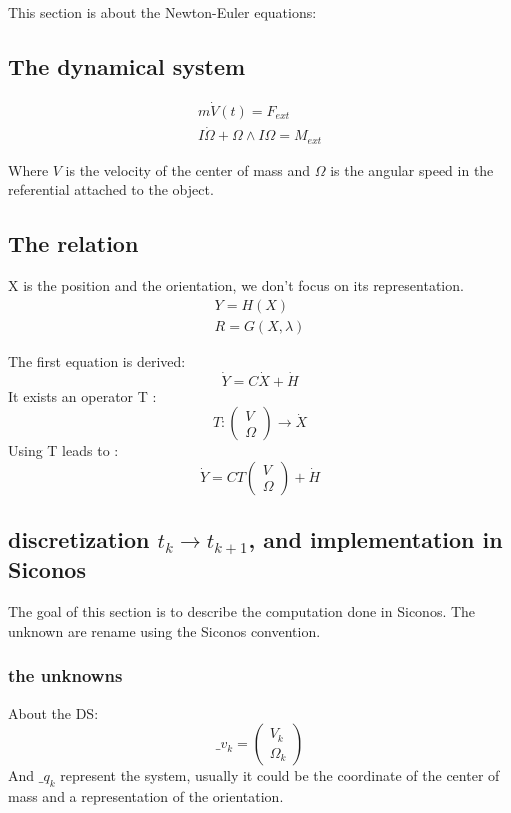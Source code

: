 This section is about the Newton-Euler equations:

\subsection{The dynamical system}

\begin{equation}
\label{NE_Dyn1}
\begin{array}{l}
m \dot{V}(t) = F_{ext}  \\
I \dot \Omega +\Omega \wedge I\Omega = M_{ext}
\end{array}
\end{equation}

Where $V$ is the velocity of the center of mass and $\Omega$ is the angular speed in the
referential attached to the object.

\subsection{The relation}
X is the position and the orientation, we don't focus on its representation.
\begin{equation}
\label{Relation}
\begin{array}{l}
Y=H(X)  \\
R=G(X,\lambda)
\end{array}
\end{equation}


The first equation is derived:
\[\dot Y = C \dot X + \dot H\]
It exists an operator T :
\[T:  \left(\begin{array}{l} V\\ \Omega\end{array}\right) \to \dot X \]
  Using T leads to :
\[\dot Y = C T \left(\begin{array}{l} V\\ \Omega\end{array}\right) + \dot H\]

\subsection{discretization $t_k \to t_{k+1}$, and implementation in Siconos}
The goal of this section is to describe the computation done in Siconos. The unknown are rename
using the Siconos convention.
\subsubsection{the unknowns}
About the DS:
\[\_v_{k}=\left(\begin{array}{c} V_k\\ \Omega _{k}\end{array}\right)\]
And $\_q_{k}$ represent the system, usually it could be the coordinate of the center of mass and a
representation of the orientation.

